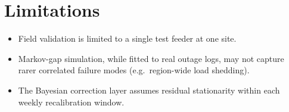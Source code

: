 \section{Limitations}
\begin{itemize}
  \item Field validation is limited to a single test feeder at one site.
  \item Markov-gap simulation, while fitted to real outage logs, may not capture rarer
        correlated failure modes (e.g.\ region-wide load shedding).
  \item The Bayesian correction layer assumes residual stationarity within each weekly
        recalibration window.
\end{itemize}
